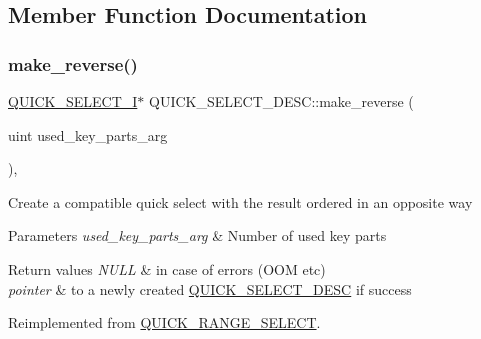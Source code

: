 \subsection{Member Function Documentation}
\mbox{\label{classQUICK__SELECT__DESC_a6ba03676b457b888636ee10c8a77bf7e}} 
\subsubsection{\texorpdfstring{make\+\_\+reverse()}{make\_reverse()}}
{\footnotesize\ttfamily \mbox{\hyperlink{classQUICK__SELECT__I}{Q\+U\+I\+C\+K\+\_\+\+S\+E\+L\+E\+C\+T\+\_\+I}}$\ast$ Q\+U\+I\+C\+K\+\_\+\+S\+E\+L\+E\+C\+T\+\_\+\+D\+E\+S\+C\+::make\+\_\+reverse (\begin{DoxyParamCaption}\item[{uint}]{used\+\_\+key\+\_\+parts\+\_\+arg }\end{DoxyParamCaption})\hspace{0.3cm}{\ttfamily [inline]}, {\ttfamily [virtual]}}

Create a compatible quick select with the result ordered in an opposite way


\begin{DoxyParams}{Parameters}
{\em used\+\_\+key\+\_\+parts\+\_\+arg} & Number of used key parts\\
\hline
\end{DoxyParams}

\begin{DoxyRetVals}{Return values}
{\em N\+U\+LL} & in case of errors (O\+OM etc) \\
\hline
{\em pointer} & to a newly created \mbox{\hyperlink{classQUICK__SELECT__DESC}{Q\+U\+I\+C\+K\+\_\+\+S\+E\+L\+E\+C\+T\+\_\+\+D\+E\+SC}} if success \\
\hline
\end{DoxyRetVals}


Reimplemented from \mbox{\hyperlink{classQUICK__RANGE__SELECT_a280387b7e06179c666ae990bee3c9894}{Q\+U\+I\+C\+K\+\_\+\+R\+A\+N\+G\+E\+\_\+\+S\+E\+L\+E\+CT}}.

\mbox{\label{classQUICK__SELECT__DESC_a2ac3395790181ce6e03646506650db69}} 
